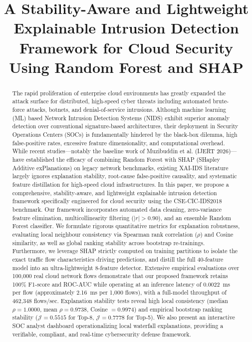 \documentclass[conference]{IEEEtran}
\begin{document}
\title{A Stability-Aware and Lightweight Explainable Intrusion Detection Framework for Cloud Security Using Random Forest and SHAP}

\author{{
}}

\maketitle

\begin{abstract}
The rapid proliferation of enterprise cloud environments has greatly expanded the attack surface for distributed, high-speed cyber threats including automated brute-force attacks, botnets, and denial-of-service intrusions. Although machine learning (ML) based Network Intrusion Detection Systems (NIDS) exhibit superior anomaly detection over conventional signature-based architectures, their deployment in Security Operations Centers (SOCs) is fundamentally hindered by the black-box dilemma, high false-positive rates, excessive feature dimensionality, and computational overhead. While recent studies---notably the baseline work of Muzibuddin et al. (IJERT 2026)---have established the efficacy of combining Random Forest with SHAP (SHapley Additive exPlanations) on legacy network benchmarks, existing XAI-IDS literature largely ignores explanation stability, root-cause false-positive causality, and systematic feature distillation for high-speed cloud infrastructures. In this paper, we propose a comprehensive, stability-aware, and lightweight explainable intrusion detection framework specifically engineered for cloud security using the CSE-CIC-IDS2018 benchmark. Our framework incorporates automated data cleaning, zero-variance feature elimination, multicollinearity filtering ($|r| > 0.90$), and an ensemble Random Forest classifier. We formulate rigorous quantitative metrics for explanation robustness, evaluating local neighbour consistency via Spearman rank correlation ($\rho$) and Cosine similarity, as well as global ranking stability across bootstrap re-trainings. Furthermore, we leverage SHAP strictly computed on training partitions to isolate the exact traffic flow characteristics driving predictions, and distill the full 40-feature model into an ultra-lightweight 8-feature detector. Extensive empirical evaluations over 100,000 real cloud network flows demonstrate that our proposed framework retains 100\% F1-score and ROC-AUC while operating at an inference latency of 0.0022~ms per flow (approximately 2.16~ms per 1,000 flows), with a full-model throughput of 462,348 flows/sec. Explanation stability tests reveal high local consistency (median $\rho = 1.0000$, mean $\rho = 0.9738$, Cosine $= 0.9974$) and empirical bootstrap ranking stability ($\mathcal{J} = 0.5515$ for Top-8, $\mathcal{J} = 0.7778$ for Top-5). We also present an interactive SOC analyst dashboard operationalizing local waterfall explanations, providing a verifiable, compliant, and real-time cybersecurity defense framework.

\end{abstract}
\end{document}
